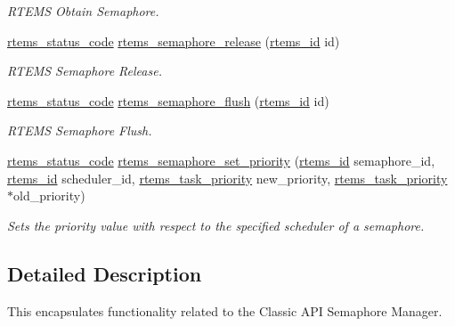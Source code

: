 \begin{DoxyCompactItemize}
\begin{DoxyCompactList}\small\item\em R\+T\+E\+MS Obtain Semaphore. \end{DoxyCompactList}\item 
\mbox{\hyperlink{group__ClassicStatus_ga545d41846817eaba6143d52ee4d9e9fe}{rtems\+\_\+status\+\_\+code}} \mbox{\hyperlink{group__ClassicSem_gae493f08a92f963ecddc7889181808402}{rtems\+\_\+semaphore\+\_\+release}} (\mbox{\hyperlink{group__ClassicTasks_gab20892b814dced7dd4e5b9bf42becd57}{rtems\+\_\+id}} id)
\begin{DoxyCompactList}\small\item\em R\+T\+E\+MS Semaphore Release. \end{DoxyCompactList}\item 
\mbox{\hyperlink{group__ClassicStatus_ga545d41846817eaba6143d52ee4d9e9fe}{rtems\+\_\+status\+\_\+code}} \mbox{\hyperlink{group__ClassicSem_ga1d9a04c45e2e1c68fd3e19ee675e6150}{rtems\+\_\+semaphore\+\_\+flush}} (\mbox{\hyperlink{group__ClassicTasks_gab20892b814dced7dd4e5b9bf42becd57}{rtems\+\_\+id}} id)
\begin{DoxyCompactList}\small\item\em R\+T\+E\+MS Semaphore Flush. \end{DoxyCompactList}\item 
\mbox{\hyperlink{group__ClassicStatus_ga545d41846817eaba6143d52ee4d9e9fe}{rtems\+\_\+status\+\_\+code}} \mbox{\hyperlink{group__ClassicSem_gad9bd7dcfb6e233a152f02f47bbf73f50}{rtems\+\_\+semaphore\+\_\+set\+\_\+priority}} (\mbox{\hyperlink{group__ClassicTasks_gab20892b814dced7dd4e5b9bf42becd57}{rtems\+\_\+id}} semaphore\+\_\+id, \mbox{\hyperlink{group__ClassicTasks_gab20892b814dced7dd4e5b9bf42becd57}{rtems\+\_\+id}} scheduler\+\_\+id, \mbox{\hyperlink{group__ClassicTasks_gaa80a0c0938307d1e99d0eb5fee765b47}{rtems\+\_\+task\+\_\+priority}} new\+\_\+priority, \mbox{\hyperlink{group__ClassicTasks_gaa80a0c0938307d1e99d0eb5fee765b47}{rtems\+\_\+task\+\_\+priority}} $\ast$old\+\_\+priority)
\begin{DoxyCompactList}\small\item\em Sets the priority value with respect to the specified scheduler of a semaphore. \end{DoxyCompactList}\end{DoxyCompactItemize}


\subsection{Detailed Description}
This encapsulates functionality related to the Classic A\+PI Semaphore Manager. 

